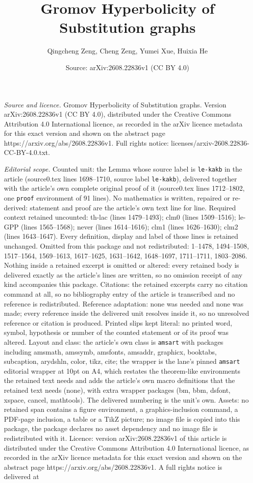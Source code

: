 \documentclass[10pt,a4paper]{amsart}
\title[Gromov Hyperbolicity of Substitution graphs]{Gromov Hyperbolicity of Substitution graphs}
\author{Qingcheng Zeng, Cheng Zeng, Yumei Xue, Huixia He}
\date{Source: arXiv:2608.22836v1 (CC BY 4.0)}
\begin{document}
\maketitle

\noindent\emph{Source and licence.} Gromov Hyperbolicity of Substitution graphs. Version arXiv:2608.22836v1 (CC BY 4.0), distributed under the Creative Commons Attribution 4.0 International licence, as recorded in the arXiv licence metadata for this exact version and shown on the abstract page https://arxiv.org/abs/2608.22836v1. Full rights notice: licenses/arxiv-2608.22836-CC-BY-4.0.txt.\par\smallskip

\noindent\textit{Editorial scope.} Counted unit: the Lemma whose source label is \texttt{le-kakb} in the article (source0.tex lines 1698--1710, source label \texttt{le-kakb}), delivered together with the article's own complete original proof of it (source0.tex lines 1712--1802, one \texttt{proof} environment of 91 lines). No mathematics is written, repaired or re-derived: statement and proof are the article's own text line for line. Required context retained uncounted: th-lac (lines 1479--1493); clm0 (lines 1509--1516); le-GPP (lines 1565--1568); never (lines 1614--1616); clm1 (lines 1626--1630); clm2 (lines 1643--1647). Every definition, display and label of those lines is retained unchanged. Omitted from this package and not redistributed: 1--1478, 1494--1508, 1517--1564, 1569--1613, 1617--1625, 1631--1642, 1648--1697, 1711--1711, 1803--2086. Nothing inside a retained excerpt is omitted or altered: every retained body is delivered exactly as the article's lines are written, so no omission receipt of any kind accompanies this package. Citations: the retained excerpts carry no citation command at all, so no bibliography entry of the article is transcribed and no reference is redistributed. Reference adaptation: none was needed and none was made; every reference inside the delivered unit resolves inside it, so no unresolved reference or citation is produced. Printed slips kept literal: no printed word, symbol, hypothesis or number of the counted statement or of its proof was altered. Layout and class: the article's own class is \texttt{amsart} with packages including amsmath, amssymb, amsfonts, amsaddr, graphicx, booktabs, subcaption, arydshln, color, tikz, cite; the wrapper is the lane's pinned \texttt{amsart} editorial wrapper at 10pt on A4, which restates the theorem-like environments the retained text needs and adds the article's own macro definitions that the retained text needs (none), with extra wrapper packages (bm, bbm, dsfont, xspace, cancel, mathtools). The delivered numbering is the unit's own. Assets: no retained span contains a figure environment, a graphics-inclusion command, a PDF-page inclusion, a table or a TikZ picture; no image file is copied into this package, the package declares no asset dependency and no image file is redistributed with it. Licence: version arXiv:2608.22836v1 of this article is distributed under the Creative Commons Attribution 4.0 International licence, as recorded in the arXiv licence metadata for this exact version and shown on the abstract page https://arxiv.org/abs/2608.22836v1. A full rights notice is delivered at 
\end{document}

